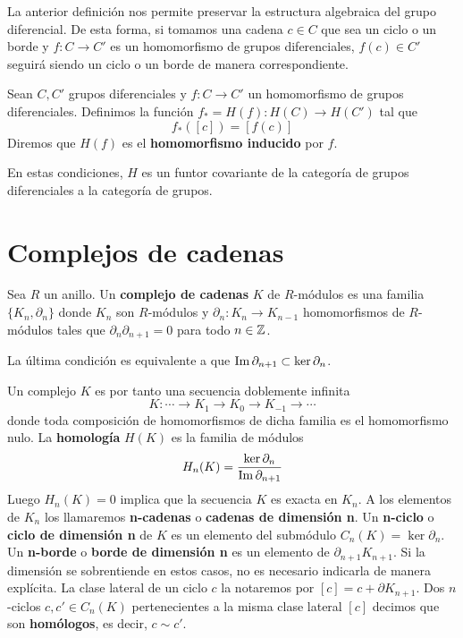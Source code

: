 La anterior definición nos permite preservar la estructura algebraica del grupo diferencial. De esta forma, si tomamos una cadena $c \in C$ que sea un ciclo o un borde y $f:C \rightarrow C'$ es un homomorfismo de grupos diferenciales, $f(c) \in C'$ seguirá siendo un ciclo o un borde de manera correspondiente.

\begin{definicion}
	Sean $C, C'$ grupos diferenciales y $f:C \rightarrow C'$ un homomorfismo de grupos diferenciales. Definimos la función $f_* = H(f): H(C) \rightarrow H(C')$ tal que 
	\[f_*([c]) = [f(c)] \]
	Diremos que $H(f)$ es el \textbf{homomorfismo inducido} por $f$.
\end{definicion}

En estas condiciones, $H$ es un funtor covariante de la categoría de grupos diferenciales a la categoría de grupos.

\section{Complejos de cadenas}

\begin{definicion}
	Sea $R$ un anillo. Un \textbf{complejo de cadenas} $K$ de $R$-módulos es una familia $\{K_n, \partial_n\}$ donde $K_n$ son $R$-módulos y $\partial_n : K_n \rightarrow K_{n-1}$ homomorfismos de $R$-módulos tales que $\partial_n \partial_{n+1} = 0$ para todo $n \in \mathbb{Z}$.
\end{definicion}
\begin{observacion}
	La última condición es equivalente a que $\operatorname{Im}{\partial_{n+1}} \subset \ker{\partial_n}$.
\end{observacion}

Un complejo $K$  es por tanto una secuencia doblemente infinita
\[ K : \cdots \rightarrow K_{1} \rightarrow K_0 \rightarrow K_{-1} \rightarrow \cdots \]
donde toda composición de homomorfismos de dicha familia es el homomorfismo nulo. La \textbf{homología} $H(K)$ es la familia de módulos
\[ H_n(K) = \frac{\ker \partial_n}{\operatorname{Im} \partial_{n+1}} \]
Luego $H_n(K)=0$ implica que la secuencia $K$ es exacta en $K_n$. A los elementos de $K_n$ los llamaremos \textbf{n-cadenas} o \textbf{cadenas de dimensión n}. Un \textbf{n-ciclo} o \textbf{ciclo de dimensión n} de $K$ es un elemento del submódulo $C_n(K) = \ker \partial_n$. Un \textbf{n-borde} o \textbf{borde de dimensión n} es un elemento de $\partial_{n+1}K_{n+1}$. Si la dimensión se sobrentiende en estos casos, no es necesario indicarla de manera explícita. La clase lateral de un ciclo $c$ la notaremos por $[c] = c + \partial K_{n+1}$. Dos $n$-ciclos $c,c' \in C_n(K)$ pertenecientes a la misma clase lateral $[c]$ decimos que son \textbf{homólogos}, es decir, $c \sim c'$.

